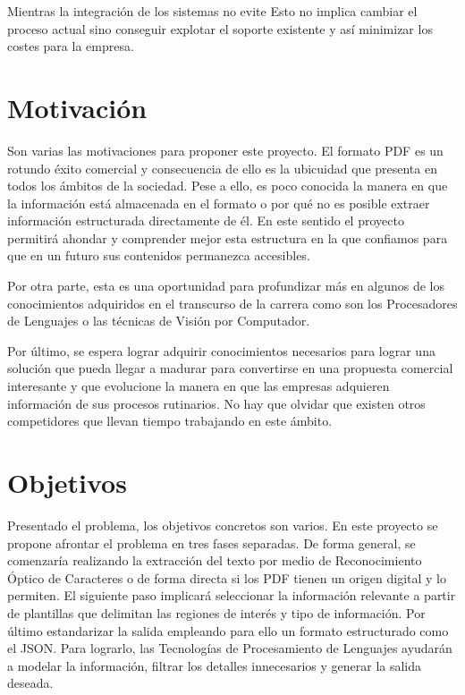 Mientras la integración de los sistemas no evite Esto no implica cambiar el proceso actual sino conseguir explotar el soporte existente y así minimizar los costes para la empresa. 


\section{Motivación}

Son varias las motivaciones para proponer este proyecto. El formato PDF es un rotundo éxito comercial y consecuencia de ello es la ubicuidad que presenta en todos los ámbitos de la sociedad. Pese a ello, es poco conocida la manera en que la información está almacenada en el formato o por qué no es posible extraer información estructurada directamente de él. En este sentido el proyecto permitirá ahondar y comprender mejor esta estructura en la que confiamos para que en un futuro sus contenidos permanezca accesibles.

Por otra parte, esta es una oportunidad para profundizar más en algunos de los conocimientos adquiridos en el transcurso de la carrera como son los Procesadores de Lenguajes o las técnicas de Visión por Computador.

Por último, se espera lograr adquirir conocimientos necesarios para lograr una solución que pueda llegar a madurar para convertirse en una propuesta comercial interesante y que evolucione la manera en que las empresas adquieren información de sus procesos rutinarios. No hay que olvidar que existen otros competidores que llevan tiempo trabajando en este ámbito.

\section{Objetivos} 

Presentado el problema, los objetivos concretos son varios. En este proyecto se propone afrontar el problema en tres fases separadas. De forma general, se comenzaría realizando la extracción del texto por medio de Reconocimiento Óptico de Caracteres o de forma directa si los PDF tienen un origen digital y lo permiten. El siguiente paso implicará seleccionar la información relevante a partir de plantillas que delimitan las regiones de interés y tipo de información. Por último estandarizar la salida empleando para ello un formato estructurado como el JSON. Para lograrlo, las Tecnologías de Procesamiento de Lenguajes ayudarán a modelar la información, filtrar los detalles innecesarios y generar la salida deseada.

